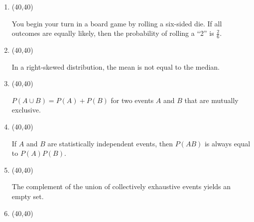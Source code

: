 \documentclass[12pt,twoside]{article}
\newcommand{\?}{\stackrel{?}{=}}
\newcommand{\fr}{\frac}
\newcommand{\gr}{\color{green!40!black}}
\begin{document}
\begin{enumerate}[\bf (i)]
\begin{minipage}{.85\linewidth}
  \end{minipage}  
  \smallskip
\item \hfill
  \begin{minipage}{.1\linewidth}
    \framebox(40,40){ \gr } %
  \end{minipage}\quad
  \begin{minipage}{.85\linewidth}
    You begin your turn in a board game by rolling a six-sided die. If all outcomes are equally likely, then the probability of rolling a ``2'' is $\fr26$.
  \end{minipage}  
  \smallskip
\item \hfill
  \begin{minipage}{.1\linewidth}
    \framebox(40,40){\gr  } %
  \end{minipage}\quad
  \begin{minipage}{.85\linewidth}
    In a right-skewed distribution, the mean is not equal to the median.
  \end{minipage}
  \smallskip
\item \hfill
  \begin{minipage}{.1\linewidth}
    \framebox(40,40){\gr } %
  \end{minipage}\quad
  \begin{minipage}{.85\linewidth}
    $P(A\cup B) = P(A) + P(B)$ for two events $A$ and $B$ that are mutually exclusive.
  \end{minipage}
  \smallskip  
\item \hfill
  \begin{minipage}{.1\linewidth}
    \framebox(40,40){\gr } %
  \end{minipage}\quad
  \begin{minipage}{.85\linewidth}
    If $A$ and $B$ are statistically independent events, then $P(AB)$ is always equal to $P(A)P(B)$.
  \end{minipage}
  \smallskip
\item \hfill
  \begin{minipage}{.1\linewidth}
    \framebox(40,40){\gr } %
  \end{minipage}\quad
  \begin{minipage}{.85\linewidth}
   The complement of the union of collectively exhaustive events yields an empty set.
  \end{minipage}  
  \smallskip  
  \item \hfill
    \begin{minipage}{.1\linewidth}
      \framebox(40,40){\gr  } %
    \end{minipage}\quad

\end{enumerate}
\end{document}
